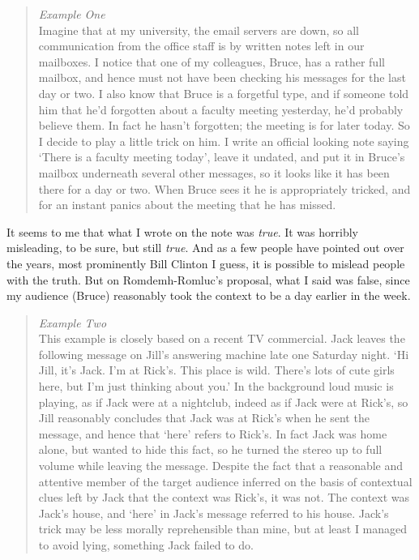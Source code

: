 \documentclass[
  10pt,
  letterpaper,
  DIV=11,
  numbers=noendperiod,
  twoside]{scrartcl}
\begin{document}
\begin{quote}
\emph{Example One}\\
Imagine that at my university, the email servers are down, so all
communication from the office staff is by written notes left in our
mailboxes. I notice that one of my colleagues, Bruce, has a rather full
mailbox, and hence must not have been checking his messages for the last
day or two. I also know that Bruce is a forgetful type, and if someone
told him that he'd forgotten about a faculty meeting yesterday, he'd
probably believe them. In fact he hasn't forgotten; the meeting is for
later today. So I decide to play a little trick on him. I write an
official looking note saying `There is a faculty meeting today', leave
it undated, and put it in Bruce's mailbox underneath several other
messages, so it looks like it has been there for a day or two. When
Bruce sees it he is appropriately tricked, and for an instant panics
about the meeting that he has missed.
\end{quote}

It seems to me that what I wrote on the note was \emph{true}. It was
horribly misleading, to be sure, but still \emph{true}. And as a few
people have pointed out over the years, most prominently Bill Clinton I
guess, it is possible to mislead people with the truth. But on
Romdemh-Romluc's proposal, what I said was false, since my audience
(Bruce) reasonably took the context to be a day earlier in the week.

\begin{quote}
\emph{Example Two}\\
This example is closely based on a recent TV commercial. Jack leaves the
following message on Jill's answering machine late one Saturday night.
`Hi Jill, it's Jack. I'm at Rick's. This place is wild. There's lots of
cute girls here, but I'm just thinking about you.' In the background
loud music is playing, as if Jack were at a nightclub, indeed as if Jack
were at Rick's, so Jill reasonably concludes that Jack was at Rick's
when he sent the message, and hence that `here' refers to Rick's. In
fact Jack was home alone, but wanted to hide this fact, so he turned the
stereo up to full volume while leaving the message. Despite the fact
that a reasonable and attentive member of the target audience inferred
on the basis of contextual clues left by Jack that the context was
Rick's, it was not. The context was Jack's house, and `here' in Jack's
message referred to his house. Jack's trick may be less morally
reprehensible than mine, but at least I managed to avoid lying,
something Jack failed to do.
\end{quote}
\end{document}
